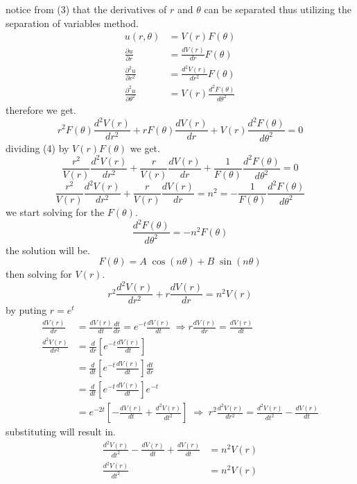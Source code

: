 \documentclass[]{article}
\begin{document}
notice from (3) that the derivatives of $r$ and $\theta$ can be separated thus utilizing the separation of variables method.
\begin{align*}
u(r,\theta) &= V(r)F(\theta)
\\
\frac{\partial u}{\partial r} &= \frac{d V(r)}{dr}F(\theta)
\\
\frac{\partial^2 u}{\partial r^2} &= \frac{d^2 V(r)}{dr^2}F(\theta)
\\
\frac{\partial^2 u}{\partial \theta^2} &= V(r)\frac{d^2 F(\theta)}{d\theta^2}
\end{align*}
therefore we get.
\begin{equation}
r^2F(\theta)\frac{d^2 V(r)}{dr^2} +rF(\theta)\frac{d V(r)}{dr} + V(r)\frac{d^2 F(\theta)}{d\theta^2} = 0
\end{equation}
dividing (4) by $V(r)F(\theta)$ we get.
\begin{equation}
\frac{r^2}{V(r)}\frac{d^2 V(r)}{dr^2} +\frac{r}{V(r)}\frac{d V(r)}{dr} + \frac{1}{F(\theta)}\frac{d^2 F(\theta)}{d\theta^2} = 0
\end{equation}
\[
    \frac{r^2}{V(r)}\frac{d^2 V(r)}{dr^2} +\frac{r}{V(r)}\frac{d V(r)}{dr} = n^2 = -\frac{1}{F(\theta)}\frac{d^2 F(\theta)}{d\theta^2}    
\]
we start solving for the $F(\theta)$. 
\[
    \frac{d^2 F(\theta)}{d\theta^2} = -n^2F(\theta)    
\]
the solution will be. 
\begin{equation}
F(\theta) = A\;\cos(n\theta)+B\;\sin(n\theta)
\end{equation}
then solving for $V(r)$.
\[
r^2\frac{d^2 V(r)}{dr^2} +r\frac{d V(r)}{dr} = n^2V(r)    
\]
by puting $r = e^t$
\begin{align*}
\frac{dV(r)}{dr} &= \frac{dV(r)}{dt}\frac{dt}{dr} = e^{-t} \frac{dV(r)}{dt}\;\Rightarrow  r \frac{dV(r)}{dr}=\frac{dV(r)}{dt}
\\
\frac{d^2V(r)}{dr^2} &= \frac{d}{dr}\left[e^{-t} \frac{dV(r)}{dt}\right]
\\
&=  \frac{d}{dt}\left[e^{-t} \frac{dV(r)}{dt}\right] \frac{dt}{dr} 
\\
&= \frac{d}{dt}\left[e^{-t} \frac{dV(r)}{dt}\right] e^{-t}
\\
&= e^{-2t}\left[-\frac{dV(r)}{dt}+\frac{d^2V(r)}{dt^2}\right] \;\Rightarrow\; r^2\frac{d^2V(r)}{dr^2} = \frac{d^2V(r)}{dt^2}-\frac{dV(r)}{dt}
\end{align*}
substituting will result in.
\begin{align*}
\frac{d^2V(r)}{dt^2}-\frac{dV(r)}{dt}+\frac{dV(r)}{dt}&=n^2V(r)
\\
\frac{d^2V(r)}{dt^2} &= n^2V(r)
\end{align*}
\end{document}
